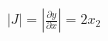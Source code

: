 \documentclass[preview]{standalone}
\begin{document}
\begin{align*}
|J| = \left|\frac{\partial y}{\partial x}\right| = 2x_2
\end{align*}
\end{document}
